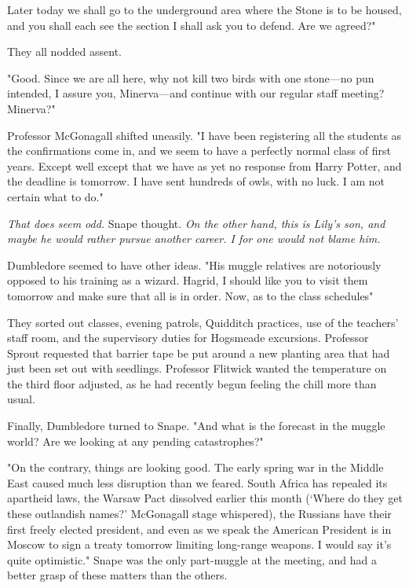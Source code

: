 \textooquote Later today we shall go to the underground area where the Stone is to be housed, and you shall each see the section I shall ask you to defend. Are we agreed?"

They all nodded assent.

"Good. Since we are all here, why not kill two birds with one stone—no pun intended, I assure you, Minerva—and continue with our regular staff meeting? Minerva?"

Professor McGonagall shifted uneasily. "I have been registering all the students as the confirmations come in, and we seem to have a perfectly normal class of first years. Except{\el} well except that we have as yet no response from Harry Potter, and the deadline is tomorrow. I have sent hundreds of owls, with no luck. I am not certain what to do."

\emph{That does seem odd.} Snape thought. \emph{On the other hand, this is Lily's son, and maybe he would rather pursue another career. I for one would not blame him.}

Dumbledore seemed to have other ideas. "His muggle relatives are notoriously opposed to his training as a wizard. Hagrid, I should like you to visit them tomorrow and make sure that all is in order. Now, as to the class schedules{\el}"

They sorted out classes, evening patrols, Quidditch practices, use of the teachers' staff room, and the supervisory duties for Hogsmeade excursions. Professor Sprout requested that barrier tape be put around a new planting area that had just been set out with seedlings. Professor Flitwick wanted the temperature on the third floor adjusted, as he had recently begun feeling the chill more than usual.

Finally, Dumbledore turned to Snape. "And what is the forecast in the muggle world? Are we looking at any pending catastrophes?"

"On the contrary, things are looking good. The early spring war in the Middle East caused much less disruption than we feared. South Africa has repealed its apartheid laws, the Warsaw Pact dissolved earlier this month (`Where do they get these outlandish names?' McGonagall stage whispered), the Russians have their first freely elected president, and even as we speak the American President is in Moscow to sign a treaty tomorrow limiting long-range weapons. I would say it's quite optimistic." Snape was the only part-muggle at the meeting, and had a better grasp of these matters than the others.

